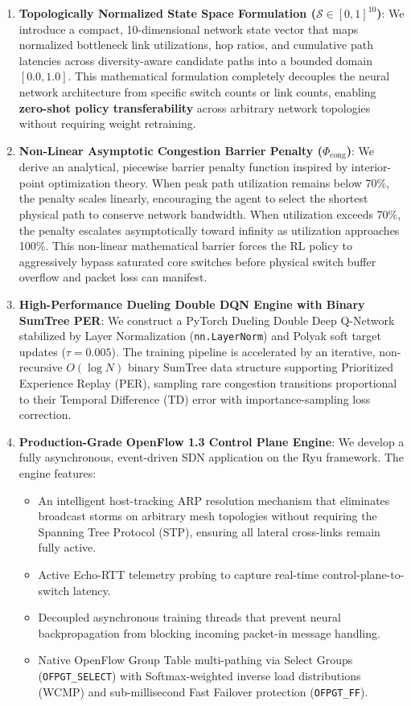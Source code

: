 \documentclass[12pt,a4paper,oneside]{report}
\begin{document}
\begin{enumerate}[label=\textbf{\arabic*.}]
    \item \textbf{Topologically Normalized State Space Formulation ($\mathcal{S} \in [0, 1]^{10}$)}:
    We introduce a compact, 10-dimensional network state vector that maps normalized bottleneck link utilizations, hop ratios, and cumulative path latencies across diversity-aware candidate paths into a bounded domain $[0.0, 1.0]$. This mathematical formulation completely decouples the neural network architecture from specific switch counts or link counts, enabling \textbf{zero-shot policy transferability} across arbitrary network topologies without requiring weight retraining.
    
    \item \textbf{Non-Linear Asymptotic Congestion Barrier Penalty ($\Phi_{\text{cong}}$)}:
    We derive an analytical, piecewise barrier penalty function inspired by interior-point optimization theory. When peak path utilization remains below 70\%, the penalty scales linearly, encouraging the agent to select the shortest physical path to conserve network bandwidth. When utilization exceeds 70\%, the penalty escalates asymptotically toward infinity as utilization approaches 100\%. This non-linear mathematical barrier forces the RL policy to aggressively bypass saturated core switches before physical switch buffer overflow and packet loss can manifest.
    
    \item \textbf{High-Performance Dueling Double DQN Engine with Binary SumTree PER}:
    We construct a PyTorch Dueling Double Deep Q-Network stabilized by Layer Normalization (\texttt{nn.LayerNorm}) and Polyak soft target updates ($\tau = 0.005$). The training pipeline is accelerated by an iterative, non-recursive $O(\log N)$ binary SumTree data structure supporting Prioritized Experience Replay (PER), sampling rare congestion transitions proportional to their Temporal Difference (TD) error with importance-sampling loss correction.
    
    \item \textbf{Production-Grade OpenFlow 1.3 Control Plane Engine}:
    We develop a fully asynchronous, event-driven SDN application on the Ryu framework. The engine features:
    \begin{itemize}
        \item An intelligent host-tracking ARP resolution mechanism that eliminates broadcast storms on arbitrary mesh topologies without requiring the Spanning Tree Protocol (STP), ensuring all lateral cross-links remain fully active.
        \item Active Echo-RTT telemetry probing to capture real-time control-plane-to-switch latency.
        \item Decoupled asynchronous training threads that prevent neural backpropagation from blocking incoming packet-in message handling.
        \item Native OpenFlow Group Table multi-pathing via Select Groups (\texttt{OFPGT\_SELECT}) with Softmax-weighted inverse load distributions (WCMP) and sub-millisecond Fast Failover protection (\texttt{OFPGT\_FF}).
    \end{itemize}
    

\end{enumerate}
\end{document}

